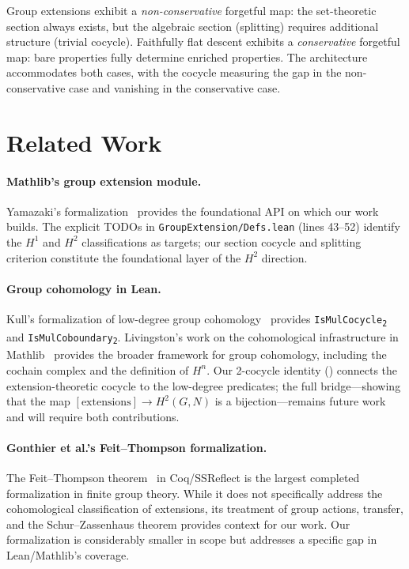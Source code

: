 \documentclass[11pt]{article}
\newcommand{\lean}[1]{\texttt{#1}}
\newcommand{\IsMulCocycle}{\lean{IsMulCocycle\textsubscript{2}}}
\newcommand{\IsMulCoboundary}{\lean{IsMulCoboundary\textsubscript{2}}}
\begin{document}
\noindent
Group extensions exhibit a \emph{non-conservative} forgetful map: the set-theoretic
section always exists, but the algebraic section (splitting) requires additional
structure (trivial cocycle).  Faithfully flat descent exhibits a \emph{conservative}
forgetful map: bare properties fully determine enriched properties.  The
architecture accommodates both cases, with the cocycle measuring the gap in the
non-conservative case and vanishing in the conservative case.

\section{Related Work}\label{sec:related}

\paragraph{Mathlib's group extension module.}
Yamazaki's formalization~\cite{Yamazaki2024} provides the foundational API on which
our work builds.  The explicit TODOs in \lean{GroupExtension/Defs.lean} (lines 43--52)
identify the $H^1$ and $H^2$ classifications as targets; our section cocycle and
splitting criterion constitute the foundational layer of the $H^2$ direction.

\paragraph{Group cohomology in Lean.}
Kull's formalization of low-degree group cohomology~\cite{Kull2024} provides
\IsMulCocycle{} and \IsMulCoboundary{}.  Livingston's work on the cohomological
infrastructure in Mathlib~\cite{Livingston2024} provides the broader framework
for group cohomology, including the cochain complex and the definition of $H^n$.
Our 2-cocycle identity () connects the extension-theoretic
cocycle to the low-degree predicates; the full bridge---showing that the map
$[\text{extensions}] \to H^2(G, N)$ is a bijection---remains future work and
will require both contributions.

\paragraph{Gonthier et al.'s Feit--Thompson formalization.}
The Feit--Thompson theorem~\cite{Gonthier2013} in Coq/SSReflect is the largest
completed formalization in finite group theory.  While it does not specifically
address the cohomological classification of extensions, its treatment of group
actions, transfer, and the Schur--Zassenhaus theorem provides context for our work.
Our formalization is considerably smaller in scope but addresses a specific gap in
Lean/Mathlib's coverage.
\end{document}
